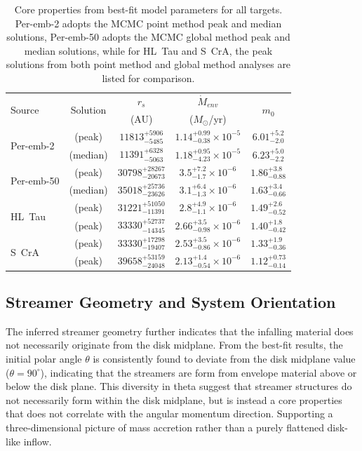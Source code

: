 \begin{table}[htbp]
\centering
\scriptsize
\begin{tabular}{lcccc}
\toprule
\midrule
\multirow{2}{*}{Source} & \multirow{2}{*}{Solution}
& $r_s$ & $\dot{M}_{env}$ & \multirow{2}{*}{$m_0$} \\
& 
& (AU) & ($M_\odot$/yr) & \\
\midrule
\multirow{2}{*}{Per-emb-2} & (peak)
& $11813^{+5906}_{-5485}$ & $1.14^{+0.99}_{-0.38}\times10^{-5}$ & $6.01^{+5.2}_{-2.0}$\\
& (median) 
& $11391^{+6328}_{-5063}$ & $1.18^{+0.95}_{-4.23}\times10^{-5}$ & $6.23^{+5.0}_{-2.2}$\\
\midrule
\multirow{2}{*}{Per-emb-50} & (peak)   
& $30798^{+28267}_{-20673}$ & $3.5^{+7.2}_{-1.7}\times10^{-6}$ & $1.86^{+3.8}_{-0.88}$\\
& (median) 
& $35018^{+25736}_{-23626}$ & $3.1^{+6.4}_{-1.3}\times10^{-6}$ & $1.63^{+3.4}_{-0.66}$\\
\midrule
\multirow{2}{*}{HL~Tau} & (peak)
& $31221^{+51050}_{-11391}$ & $2.8^{+4.9}_{-1.1}\times10^{-6}$ & $1.49^{+2.6}_{-0.52}$\\
& (peak) 
& $33330^{+52737}_{-14345}$ & $2.66^{+3.5}_{-0.98}\times10^{-6}$ & $1.40^{+1.8}_{-0.42}$\\
\midrule
\multirow{2}{*}{S~CrA} & (peak)
& $33330^{+17298}_{-19407}$ & $2.53^{+3.5}_{-0.86}\times10^{-6}$ & $1.33^{+1.9}_{-0.36}$\\
& (peak) 
& $39658^{+53159}_{-24048}$ & $2.13^{+1.4}_{-0.54}\times10^{-6}$ & $1.12^{+0.73}_{-0.14}$\\
\midrule
\bottomrule
\end{tabular}
\caption{
Core properties from best-fit model parameters for all targets. Per-emb-2 adopts the MCMC point method peak and median solutions, Per-emb-50 adopts the MCMC global method peak and median solutions, while for HL~Tau and S~CrA, the peak solutions from both point method and global method analyses are listed for comparison.
}
\label{table:best_fit_core_properties}
\end{table}

\subsection{Streamer Geometry and System Orientation}
The inferred streamer geometry further indicates that the infalling material does not necessarily originate from the disk midplane. From the best-fit results, the initial polar angle $\theta$ is consistently found to deviate from the disk midplane value ($\theta = 90^\circ$), indicating that the streamers are form from envelope material above or below the disk plane. This diversity in theta suggest that streamer structures do not necessarily form within the disk midplane, but is instead a core properties that does not correlate with the angular momentum direction. Supporting a three-dimensional picture of mass accretion rather than a purely flattened disk-like inflow.

